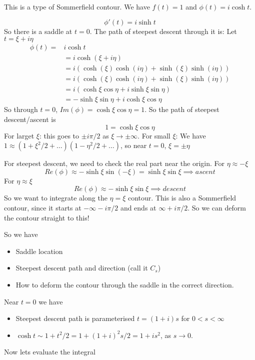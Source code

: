 \documentclass{X:/Documents/Coding/Latex/myassignment}
\begin{document}
This is a type of Sommerfield contour. We have $f(t)=1$ and $\phi(t) = i\cosh t$.

\[\phi'(t) = i\sinh t\]
So there is a saddle at $t=0$. The path of steepest descent through it is:
Let $t=\xi + i\eta$
\begin{align*}
    \phi(t) =& i\cosh t\\
    &= i\cosh(\xi+i\eta)\\
    &= i\left(\cosh(\xi)\cosh(i\eta) + \sinh(\xi)\sinh(i\eta)\right)\\
    &= i\left(\cosh(\xi)\cosh(i\eta) + \sinh(\xi)\sinh(i\eta)\right)\\
    &= i\left(\cosh \xi \cos \eta + i\sinh \xi \sin\eta\right)\\
    &=-\sinh \xi \sin \eta + i\cosh\xi \cos \eta
\end{align*}
So through $t=0$, $Im(\phi) = \cosh\xi\cos\eta = 1$. So the path of steepest descent/ascent is
\[1 = \cosh \xi \cos \eta\]
For larget $\xi$: this goes to $\pm i\pi/2$ as $\xi\to\pm \infty$. 
For small $\xi$: We have $1\approx(1+\xi^2/2 + \ldots)(1-\eta^2/2 + \ldots)$, so near $t=0$, $\xi= \pm \eta$

For steepest descent, we need to check the real part near the origin. For $\eta \approx -\xi$
\[Re(\phi) \approx -\sinh\xi \sin(-\xi) = \sinh\xi\sin\xi \implies ascent\]
For $\eta \approx \xi$
\[Re(\phi) \approx - \sinh\xi \sin \xi \implies descent\]
So we want to integrate along the $\eta=\xi$ contour. This is also a Sommerfield contour, since it starts at $-\infty -i\pi/2$ and ends at $\infty + i\pi/2$.
So we can deform the contour straight to this!

So we have 
\begin{itemize}
    \item Saddle location
    \item Steepest descent path and direction (call it $C_s$)
    \item How to deform the contour through the saddle in the correct direction.
\end{itemize}
Near $t=0$ we have
\begin{itemize}
    \item Steepest descent path is parameterised $t = (1+i)s$ for $0<s<\infty$
    \item $\cosh t \sim 1 + t^2/2 = 1 + (1+i)^2 s/2 = 1 + is^2$, as $s\to 0$.
\end{itemize}

Now lets evaluate the integral
\end{document}
